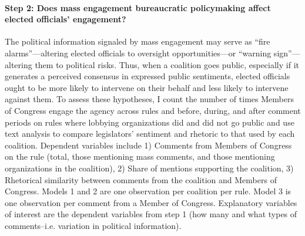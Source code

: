 \paragraph{Step 2: Does mass engagement bureaucratic policymaking affect elected officials' engagement?} The political information signaled by mass engagement may serve as ``fire alarms''---altering elected officials to oversight opportunities---or ``warning sign''---altering them to political risks.
Thus, when a coalition goes public, especially if it generates a perceived consensus in expressed public sentiments, elected officials ought to be more likely to intervene on their behalf and less likely to intervene against them.  
To assess these hypotheses, I count the number of times Members of Congress engage the agency across rules and before, during, and after comment periods on rules where lobbying organizations did and did not go public and use text analysis to compare legislators' sentiment and rhetoric to that used by each coalition.
Dependent variables include 1) Comments from Members of Congress on the rule (total, those mentioning mass comments, and those mentioning organizations in the coalition), %
2) Share of mentions supporting the coalition, %
3) Rhetorical similarity between comments from the coalition and Members of Congress. 
Models 1 and 2 are one observation per coalition per rule. Model 3 is one observation per comment from a Member of Congress. Explanatory variables of interest are the dependent variables from step 1 (how many and what types of comments--i.e. variation in political information).%

